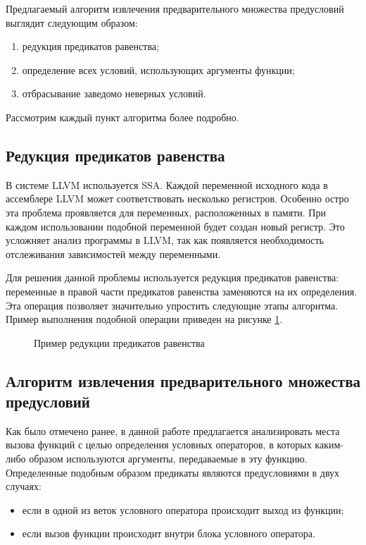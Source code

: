 Предлагаемый алгоритм извлечения предварительного множества предусловий выглядит следующим образом:
\begin{enumerate}
\item редукция предикатов равенства;
\item определение всех условий, использующих аргументы функции;
\item отбрасывание заведомо неверных условий.
\end{enumerate}

Рассмотрим каждый пункт алгоритма более подробно.

\subsection{Редукция предикатов равенства}
\label{subsection:reduction}
В системе LLVM используется SSA. Каждой переменной исходного кода в ассемблере LLVM может соответствовать несколько регистров. Особенно остро эта проблема проявляется для переменных, расположенных  в памяти. При каждом использовании подобной переменной будет создан новый регистр. Это усложняет анализ программы в LLVM, так как появляется необходимость отслеживания зависимостей между переменными.

Для решения данной проблемы используется редукция предикатов равенства: переменные в правой части предикатов равенства заменяются на их определения. Эта операция позволяет значительно упростить следующие этапы алгоритма. Пример выполнения подобной операции приведен на рисунке \ref{image:equalityMapperExample}.
\begin{figure}[h!]
\caption{Пример редукции предикатов равенства}
\label{image:equalityMapperExample}
\end{figure}

\subsection{Алгоритм извлечения предварительного множества предусловий}
\label{subsection:extraction}
Как было отмечено ранее, в данной работе предлагается анализировать места вызова функций с целью определения условных операторов, в которых каким-либо образом используются аргументы, передаваемые в эту функцию. Определенные подобным образом предикаты являются предусловиями в двух случаях:
\begin{itemize}
\item если в одной из веток условного оператора происходит выход из функции;
\item если вызов функции происходит внутри блока условного оператора.
\end{itemize}

